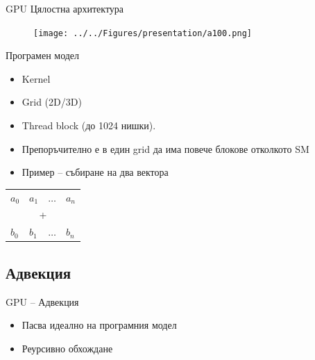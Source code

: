\documentclass{beamer}
\begin{document}
\begin{frame}{GPU Цялостна архитектура}
   \begin{figure}[H]
  \centering
  \texttt{[image: ../../Figures/presentation/а100.png]}
\end{figure}
\end{frame}
\begin{frame}{Програмен модел}
	\begin{itemize}[<+->]
		\item Kernel
		\item Grid (2D/3D)
		\item Thread block (до 1024 нишки).
		\item Препоръчително е в един grid да има повече блокове отколкото SM
		\item Пример -- събиране на два вектора
	\end{itemize}
	\begin{table}[]
\begin{tabular}{llll}
$a_0$ & $a_1$ & $\dots$ & $a_n$ \\
\multicolumn{4}{c}{+} \\
$b_0$ & $b_1$ & $\dots$ & $b_n$
\end{tabular}
\end{table}
\end{frame}

\subsection{Адвекция}
\begin{frame}{GPU -- Адвекция}
	\begin{itemize}
		\item Пасва идеално на програмния модел
		\item Реурсивно обхождане
	\end{itemize}
\end{frame}
\end{document}
